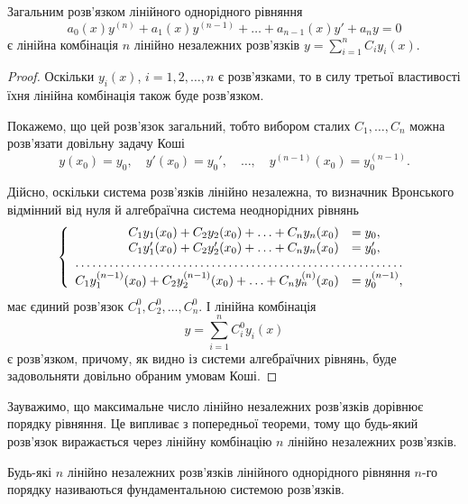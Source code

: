 \begin{theorem}
	Загальним розв'язком лінійного однорідного рівняння
	\begin{equation*}
		a_0(x) y^{(n)} + a_1(x) y^{(n-1)} + \ldots + a_{n-1}(x) y' + a_n y = 0
	\end{equation*}
 	є лінійна комбінація $n$ лінійно незалежних розв'язків $y = \sum_{i = 1}^n C_i y_i(x)$.
\end{theorem}

\begin{proof}
	Оскільки $y_i(x)$, $i = 1, 2, \ldots, n$ є розв'язками, то в силу третьої властивості їхня лінійна комбінація також буде розв'язком. \parvskip

	Покажемо, що цей розв'язок загальний, тобто вибором сталих $C_1, \ldots, C_n$ можна розв'язати довільну задачу Коші
	\begin{equation*}
		y(x_0) = y_0, \quad y'(x_0) = y_0', \quad \ldots, \quad y^{(n - 1)}(x_0) = y_0^{(n - 1)}.
	\end{equation*}

	Дійсно, оскільки система розв'язків лінійно незалежна, то визначник Вронського відмінний від нуля й алгебраїчна система неоднорідних рівнянь
	\begin{equation*}
		\left\{ \begin{array}{rl}
			C_1 y_1(x_0) + C_2 y_2(x_0) + \ldots + C_n y_n(x_0) &= y_0, \\
			C_1 y_1'(x_0) + C_2 y_2'(x_0) + \ldots + C_n y_n(x_0) &= y_0', \\
			\hdotsfor{2} \\
			C_1 y_1^{(n - 1)}(x_0) + C_2 y_2^{(n - 1)}(x_0) + \ldots + C_n y_n^{(n)}(x_0) &= y_0^{(n - 1)},
		\end{array} \right.
	\end{equation*}
	має єдиний розв'язок $C_1^0, C_2^0, \ldots, C_n^0$. І лінійна комбінація
	\begin{equation*}
	    y = \sum_{i = 1}^n C_i^0 y_i(x)
	\end{equation*}
	є розв'язком, причому, як видно із системи алгебраїчних рівнянь, буде задовольняти довільно обраним умовам Коші.
\end{proof}

Зауважимо, що максимальне число лінійно незалежних розв'язків дорівнює порядку рівняння. Це випливає з попередньої теореми, тому що будь-який розв'язок виражається через лінійну комбінацію $n$ лінійно незалежних розв'язків.

\begin{definition}
	Будь-які $n$ лінійно незалежних розв'язків лінійного однорідного рівняння $n$-го порядку називаються фундаментальною системою розв'язків.
\end{definition}